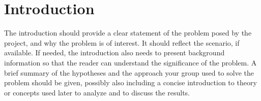 \section{Introduction}
The introduction should provide a clear statement of the problem posed by the project, and why the problem is of interest.
It should reflect the scenario, if available.
If needed, the introduction also needs to present background information so that the reader can understand the significance of the problem.
A brief summary of the hypotheses and the approach your group used to solve the problem should be given,
possibly also including a concise introduction to theory or concepts used later to analyze and to discuss the results.
